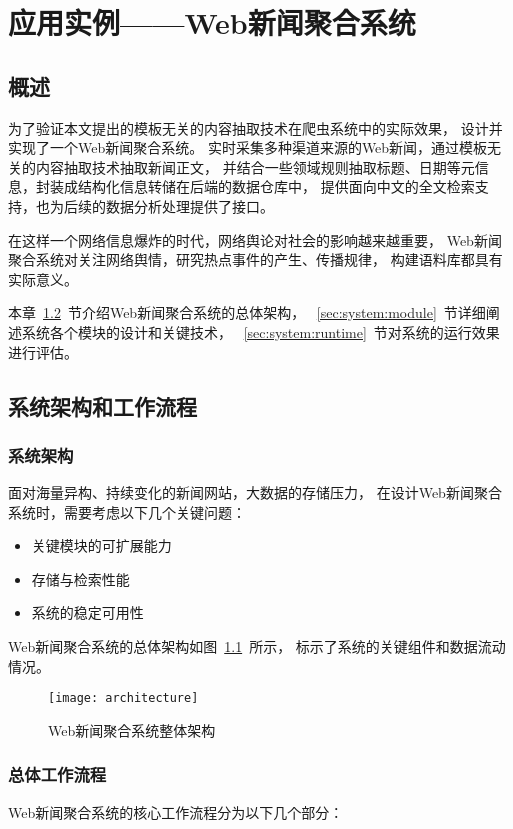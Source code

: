 
\chapter{应用实例——Web新闻聚合系统}

\section{概述}
\label{sec:system-intro}
为了验证本文提出的模板无关的内容抽取技术在爬虫系统中的实际效果，
设计并实现了一个Web新闻聚合系统。
实时采集多种渠道来源的Web新闻，通过模板无关的内容抽取技术抽取新闻正文，
并结合一些领域规则抽取标题、日期等元信息，封装成结构化信息转储在后端的数据仓库中，
提供面向中文的全文检索支持，也为后续的数据分析处理提供了接口。

在这样一个网络信息爆炸的时代，网络舆论对社会的影响越来越重要，
Web新闻聚合系统对关注网络舆情，研究热点事件的产生、传播规律，
构建语料库都具有实际意义。

本章~\ref{sec:system:architecture}~节介绍Web新闻聚合系统的总体架构，
~\ref{sec:system:module}~节详细阐述系统各个模块的设计和关键技术，
~\ref{sec:system:runtime}~节对系统的运行效果进行评估。

\section{系统架构和工作流程}
\label{sec:system:architecture}

\subsection{系统架构}
面对海量异构、持续变化的新闻网站，大数据的存储压力，
在设计Web新闻聚合系统时，需要考虑以下几个关键问题：
\begin{itemize}
\item 关键模块的可扩展能力
\item 存储与检索性能
\item 系统的稳定可用性
\end{itemize}

Web新闻聚合系统的总体架构如图~\ref{fig:architecture}~所示，
标示了系统的关键组件和数据流动情况。

\begin{figure}[htbp]
\centering
\texttt{[image: architecture]}
\caption{Web新闻聚合系统整体架构}
\label{fig:architecture}
\end{figure}

\subsection{总体工作流程}
Web新闻聚合系统的核心工作流程分为以下几个部分：

